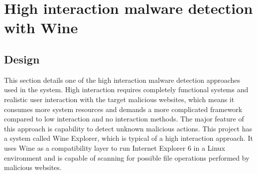 \section{High interaction malware detection with Wine}
\subsection{Design}
This section details one of the high interaction malware detection 
approaches used in the system. High interaction requires completely functional systems 
and realistic user interaction with the target malicious websites, which means 
it consumes more system resources and demands a more complicated 
framework compared to low interaction and no interaction methods. The major 
feature of this approach is capability to detect unknown malicious 
actions. This project has a system called Wine Explorer, 
which is typical of a high interaction approach. It uses Wine as a compatibility layer to run 
Internet Explorer 6 in a Linux environment and is capable of scanning for 
possible file operations performed by malicious websites. 

